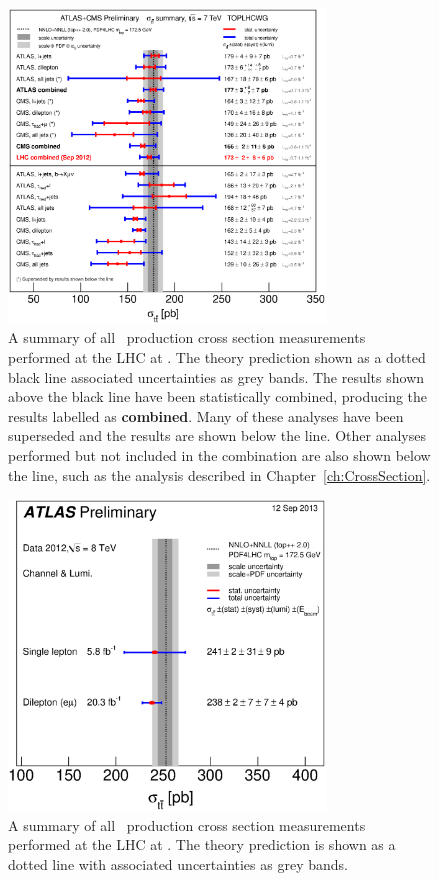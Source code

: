 \begin{figure}[htbp]
  \centering
  \includegraphics[width=0.75\textwidth]{PartTopQuark/Plots/tt_xsec_7TeV.eps}
  \caption[A summary of all \ttbar\ production cross section measurements performed at the LHC at \cmsS.]{A summary of all \ttbar\ production cross section measurements performed at the LHC at \cmsS. The theory prediction shown as a dotted black line associated uncertainties as grey bands. The results shown above the black line have been statistically combined, producing the results labelled as \textbf{combined}. Many of these analyses have been superseded and the results are shown below the line. Other analyses performed but not included in the combination are also shown below the line, such as the analysis described in Chapter~\ref{ch:CrossSection}.}
  \label{fig:TopQuarkPairProductionSummaryLHC}
\end{figure}

\begin{figure}[htbp]
  \centering
  \includegraphics[width=0.75\textwidth]{PartTopQuark/Plots/tt_xsec_8TeV.eps}
  \caption[A summary of all \ttbar\ production cross section measurements performed at the LHC at \cmsE.]{A summary of all \ttbar\ production cross section measurements performed at the LHC at \cmsE. The theory prediction is shown as a dotted line with associated uncertainties as grey bands.}
  \label{fig:TopQuarkPairProduction8TeV}
\end{figure}

